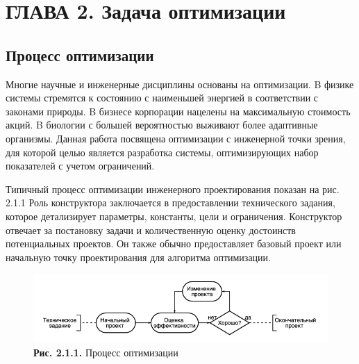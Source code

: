 \chapter{ ГЛАВА 2. Задача оптимизации}
\label{ch:chapter2}

\section{Процесс оптимизации}

Многие научные и инженерные дисциплины основаны на оптимизации. B физике системы стремятся к состоянию с наименьшей энергией в соответствии с законами природы. B бизнесе корпорации нацелены на максимальную стоимость акций. B биологии с большей вероятностью выживают более адаптивные организмы. Данная работа посвящена оптимизации с инженерной точки зрения, для которой целью является разработка системы, оптимизирующих набор показателей с учетом ограничений.

Типичный процесс оптимизации инженерного проектирования показан на рис. 2.1.1 Роль конструктора заключается в предоставлении технического задания, которое детализирует параметры, константы, цели и ограничения. Конструктор отвечает за постановку задачи и количественную оценку достоинств потенциальных проектов. Он также обычно предоставляет базовый проект или начальную точку проектирования для алгоритма оптимизации.

\begin{figure}[ht]
 \centering
		\includegraphics[height =15 cm, keepaspectratio]{images/1_1_1diagram.png}
		\caption{ \textbf{Рис. 2.1.1.} Процесс оптимизации }
	\end{figure}

